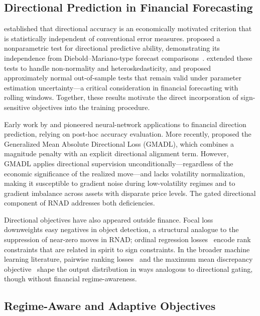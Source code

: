 \documentclass[11pt]{article}
\newcommand{\RNAD}{RNAD\xspace}
\begin{document}
\subsection{Directional Prediction in Financial Forecasting}

\citet{leitch1991economic} established that directional accuracy is an
economically motivated criterion that is statistically independent of
conventional error measures. \citet{pesaran1992simple} proposed a
nonparametric test for directional predictive ability, demonstrating
its independence from Diebold--Mariano-type forecast
comparisons~\citep{diebold1995comparing}. \citet{harvey1997testing}
extended these tests to handle non-normality and heteroskedasticity,
and \citet{clark2007approximately} proposed approximately normal
out-of-sample tests that remain valid under parameter estimation
uncertainty---a critical consideration in financial forecasting with
rolling windows. Together, these results motivate the direct
incorporation of sign-sensitive objectives into the training procedure.

Early work by \citet{white1988economic} and \citet{kuan1995forecasting}
pioneered neural-network applications to financial direction prediction,
relying on post-hoc accuracy evaluation. More recently,
\citet{michankow2024gmadl} proposed the Generalized Mean
Absolute Directional Loss (GMADL), which combines a magnitude
penalty with an explicit directional alignment term. However, GMADL
applies directional supervision unconditionally---regardless of the
economic significance of the realized move---and lacks volatility
normalization, making it susceptible to gradient noise during
low-volatility regimes and to gradient imbalance across assets with
disparate price levels. The gated directional component of \RNAD
addresses both deficiencies.

Directional objectives have also appeared outside finance. Focal
loss~\citep{focal} downweights easy negatives in object detection, a
structural analogue to the suppression of near-zero moves in \RNAD;
ordinal regression losses~\citep{gutierrez2016ordinal} encode rank
constraints that are related in spirit to sign constraints. In the
broader machine learning literature, pairwise ranking
losses~\citep{burges2005learning} and the maximum mean discrepancy
objective~\citep{gretton2012kernel} shape the output distribution in
ways analogous to directional gating, though without financial
regime-awareness.

\subsection{Regime-Aware and Adaptive Objectives}
\end{document}
